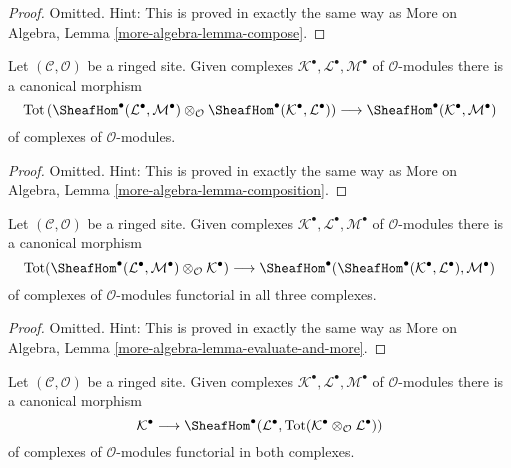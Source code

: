 \begin{proof}
Omitted. Hint: This is proved in exactly the same way as
More on Algebra, Lemma \ref{more-algebra-lemma-compose}.
\end{proof}

\begin{lemma}
\label{lemma-composition}
Let $(\mathcal{C}, \mathcal{O})$ be a ringed site. Given complexes
$\mathcal{K}^\bullet, \mathcal{L}^\bullet, \mathcal{M}^\bullet$
of $\mathcal{O}$-modules there is a canonical morphism
$$
\text{Tot}\left(
\SheafHom^\bullet(\mathcal{L}^\bullet, \mathcal{M}^\bullet)
\otimes_\mathcal{O}
\SheafHom^\bullet(\mathcal{K}^\bullet, \mathcal{L}^\bullet)
\right)
\longrightarrow
\SheafHom^\bullet(\mathcal{K}^\bullet, \mathcal{M}^\bullet)
$$
of complexes of $\mathcal{O}$-modules.
\end{lemma}

\begin{proof}
Omitted. Hint: This is proved in exactly the same way as
More on Algebra, Lemma \ref{more-algebra-lemma-composition}.
\end{proof}

\begin{lemma}
\label{lemma-evaluate-and-more}
Let $(\mathcal{C}, \mathcal{O})$ be a ringed site. Given complexes
$\mathcal{K}^\bullet, \mathcal{L}^\bullet, \mathcal{M}^\bullet$
of $\mathcal{O}$-modules there is a canonical morphism
$$
\text{Tot}(\SheafHom^\bullet(\mathcal{L}^\bullet,
\mathcal{M}^\bullet) \otimes_\mathcal{O} \mathcal{K}^\bullet)
\longrightarrow
\SheafHom^\bullet(\SheafHom^\bullet(\mathcal{K}^\bullet,
\mathcal{L}^\bullet), \mathcal{M}^\bullet)
$$
of complexes of $\mathcal{O}$-modules functorial in all three complexes.
\end{lemma}

\begin{proof}
Omitted. Hint: This is proved in exactly the same way as
More on Algebra, Lemma \ref{more-algebra-lemma-evaluate-and-more}.
\end{proof}

\begin{lemma}
\label{lemma-diagonal}
Let $(\mathcal{C}, \mathcal{O})$ be a ringed site. Given complexes
$\mathcal{K}^\bullet, \mathcal{L}^\bullet, \mathcal{M}^\bullet$
of $\mathcal{O}$-modules there is a canonical morphism
$$
\mathcal{K}^\bullet
\longrightarrow
\SheafHom^\bullet(\mathcal{L}^\bullet,
\text{Tot}(\mathcal{K}^\bullet \otimes_\mathcal{O} \mathcal{L}^\bullet))
$$
of complexes of $\mathcal{O}$-modules functorial in both complexes.
\end{lemma}

